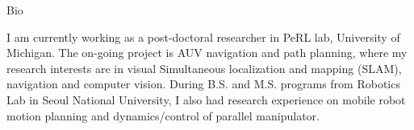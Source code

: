 \begin{rSection}{Bio}

I am currently working as a post-doctoral researcher in \ac{PeRL} lab, University of Michigan. The on-going project is \ac{AUV} navigation and path planning, where my research interests are in visual Simultaneous localization and mapping (SLAM), navigation and computer vision. During B.S. and M.S. programs from Robotics Lab in Seoul National University, I also had research experience on mobile robot motion planning and dynamics/control of parallel manipulator. 

\end{rSection}
